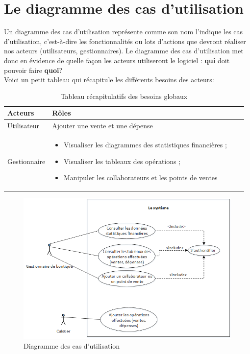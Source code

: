 \documentclass[12pt]{report}
\begin{document}
      \section{Le diagramme des cas d'utilisation}
	Un diagramme des cas d'utilisation représente comme son nom l'indique les cas d'utilisation, c'est-à-dire les fonctionnalités ou lots d'actions que devront réaliser nos acteurs (utilisateurs, gestionnaires). Le diagramme des cas d'utilisation met donc en évidence de quelle façon les acteurs utiliseront le logiciel : \textbf{qui} doit pouvoir faire \textbf{quoi}? \cite{uml}
	\\Voici un petit tableau qui récapitule les différents besoins des acteurs:
	
	\begin{table}[H]
	  \begin{center}
	    \begin{tabular}{|p{4cm}|l|p{9cm}l|}
	      \hline
		\textbf{Acteurs} & \textbf{Rôles} \\
	      \hline
		Utilisateur & Ajouter une vente et une dépense \\
	      \hline
		Gestionnaire &  
		\begin{minipage}{12cm}
		  \begin{itemize}
		    \item Visualiser les diagrammes des statistiques financières ;
		    \item Visualiser les tableaux des opérations ;
		    \item Manipuler les collaborateurs et les points de ventes
		  \end{itemize}
		 \end{minipage}\\
		 \hline
	    \end{tabular}
	    \caption{Tableau récapitulatifs des besoins globaux}
	  \end{center}
	\end{table}

	\begin{figure}[H]
	  \begin{center}
	    \includegraphics[scale=0.7]{images/diagramUserCase.png}
	    \caption{Diagramme des cas d'utilisation}
	  \end{center}
	\end{figure}
	  
\end{document}
